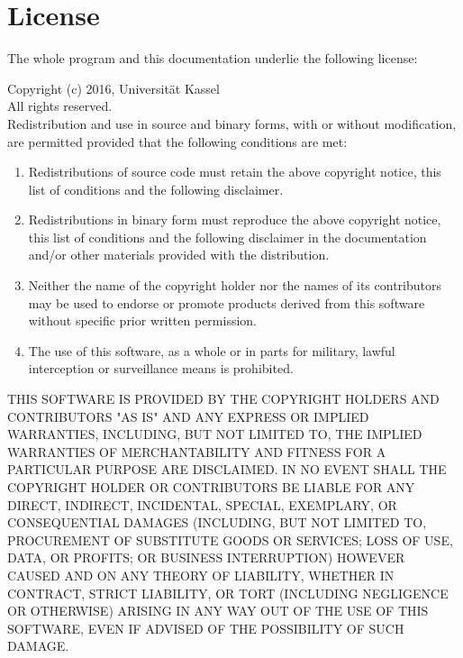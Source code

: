 
\section{License}

The whole program and this documentation underlie the following license:

Copyright (c) 2016, Universität Kassel\\
All rights reserved.\\
Redistribution and use in source and binary forms, with or without modification, are permitted provided that the following conditions are met:\\
\begin{enumerate}
 \item Redistributions of source code must retain the above copyright notice, this list of conditions and the following disclaimer.
 \item Redistributions in binary form must reproduce the above copyright notice, 
 this list of conditions and the following disclaimer in the documentation and/or other materials provided with the distribution.
 \item Neither the name of the copyright holder nor the names of its contributors may be used to endorse or promote 
 products derived from this software without specific prior written permission.
 \item The use of this software, as a whole or in parts for military, lawful interception or surveillance means is prohibited.
\end{enumerate}
THIS SOFTWARE IS PROVIDED BY THE COPYRIGHT HOLDERS AND CONTRIBUTORS "AS IS" AND ANY EXPRESS OR IMPLIED WARRANTIES, INCLUDING, BUT NOT 
LIMITED TO, THE IMPLIED WARRANTIES OF MERCHANTABILITY AND 
FITNESS FOR A PARTICULAR PURPOSE ARE DISCLAIMED. IN NO EVENT SHALL THE COPYRIGHT HOLDER OR CONTRIBUTORS BE LIABLE FOR ANY DIRECT, 
INDIRECT, INCIDENTAL, SPECIAL, EXEMPLARY, OR CONSEQUENTIAL DAMAGES (INCLUDING, BUT NOT LIMITED TO, 
PROCUREMENT OF SUBSTITUTE GOODS OR SERVICES; LOSS OF USE, DATA, OR PROFITS; OR BUSINESS INTERRUPTION) HOWEVER CAUSED AND ON ANY THEORY 
OF LIABILITY, WHETHER IN CONTRACT, STRICT LIABILITY, OR TORT (INCLUDING NEGLIGENCE OR OTHERWISE) 
ARISING IN ANY WAY OUT OF THE USE OF THIS SOFTWARE, EVEN IF ADVISED OF THE POSSIBILITY OF SUCH DAMAGE.
